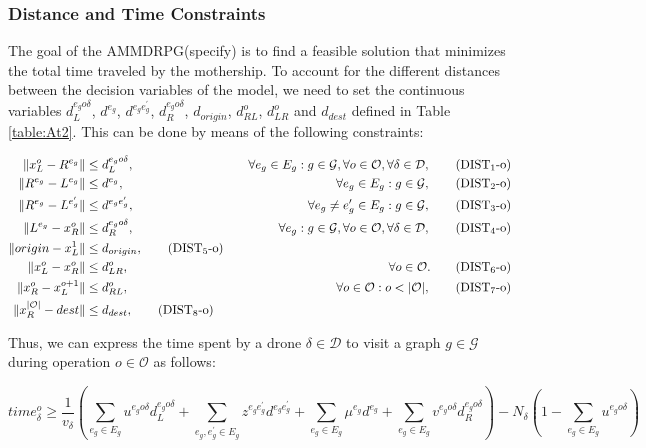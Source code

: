\documentclass[10pt,a4paper]{elsarticle}
\def\AMD{{\sf AMMDRPG\xspace}}
\begin{document}
			\subsubsection*{Distance and Time Constraints}
			\noindent
			The goal of the \AMD\xspace (specify) is to find a feasible solution that minimizes the total time traveled by the mothership. To account for the different distances between the decision variables of the model, we need to set the continuous variables $d_L^{e_go\delta}$, $d^{e_g}$, $d^{e_ge^\prime_g}$, $d_R^{e_go\delta}$, $d_{origin}$, $d_{RL}^o$, $d_{LR}^o$ and $d_{dest}$ defined in Table \ref{table:At2}. This can be done by means of the following constraints:
			
			
			\begin{align*}
				\|x_L^o- R^{e_g}\| & \leq  d_L^{e_go\delta},  &\quad \forall e_g\in E_g:g\in \mathcal{G}, \forall o\in \mathcal O, \forall \delta\in\mathcal D, \tag{DIST$_{1}$-o} \label{eq:NOd1}\\
				\|R^{e_g}- L^{e_g}\| & \leq  d^{e_g},  &\quad \forall e_g\in E_g:g\in \mathcal{G}, \tag{DIST$_{2}$-o} \label{eq:NOd2}\\
				\|R^{e_g}- L^{e^\prime_g}\| & \leq  d^{e_ge^\prime_g}, &\quad \forall e_g\neq e_g'\in E_g:g\in \mathcal{G}, \tag{DIST$_{3}$-o} \label{eq:NOd3}\\
				\|L^{e_g}- x_R^o\| & \leq  d_R^{e_go\delta}, &\quad \forall e_g:g\in \mathcal{G},\forall o\in \mathcal O, \forall \delta\in\mathcal D, \tag{DIST$_{4}$-o} \label{eq:NOd4}\\
				\|origin - x_L^1\| & \leq d_{origin}, \tag{DIST$_5$-o}\label{eq:NOd5}\\
				\|x_L^o- x_R^o\| & \leq  d_{LR}^o, & \quad \forall o\in \mathcal O. \tag{DIST$_{6}$-o} \label{eq:NOd6}\\
				\|x_R^o- x_L^{o+1}\| & \leq  d_{RL}^o, & \quad \forall o\in \mathcal O:o<|\mathcal O|, \tag{DIST$_{7}$-o} \label{eq:NOd7}\\
				\|x_R^{|\mathcal O|} - dest\| & \leq d_{dest}, \tag{DIST$_8$-o}\label{eq:NOd8}\\
			\end{align*}
			
			\noindent
			Thus, we can express the time spent by a drone $\delta \in \mathcal D$ to visit a graph $g \in \mathcal G$ during operation $o \in \mathcal O$ as follows:
			
			\begin{equation}
				time_\delta^o \geq \frac{1}{v_\delta}\left(\sum_{e_g\in E_g} u^{e_go\delta}d_L^{e_go\delta} + \sum_{e_g, e^\prime_g\in E_g}z^{e_ge^\prime_g}d^{e_ge^\prime_g} + \sum_{e_g\in E_g} \mu^{e_g}d^{e_g} + \sum_{e_g\in E_g} v^{e_go\delta}d_R^{e_go\delta}\right) - N_\delta(1 - \sum_{e_g\in E_g} u^{e_go\delta})
				\label{eq:NOtimed}
			\end{equation}
			
\end{document}
